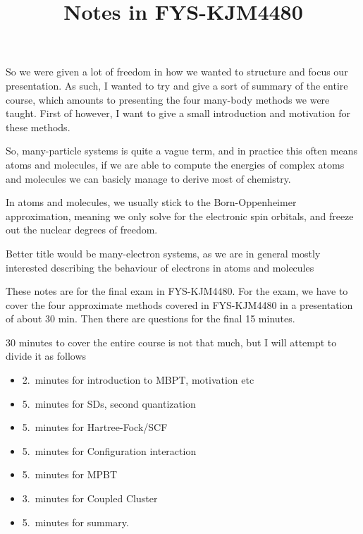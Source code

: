 \documentclass[a4paper, 11pt, notitlepage, english]{article}
\author{}
\title{Notes in FYS-KJM4480}
\begin{document}
So we were given a lot of freedom in how we wanted to structure and focus our presentation. As such, I wanted to try and give a sort of summary of the entire course, which amounts to presenting the four many-body methods we were taught. First of however, I want to give a small introduction and motivation for these methods.

So, many-particle systems is quite a vague term, and in practice this often means atoms and molecules, if we are able to compute the energies of complex atoms and molecules we can basicly  manage to derive most of chemistry. 

In atoms and molecules, we usually stick to the Born-Oppenheimer approximation, meaning we only solve for the electronic spin orbitals, and freeze out the nuclear degrees of freedom.




Better title would be many-electron systems, as we are in general mostly interested
describing the behaviour of electrons in atoms and molecules





\clearpage


These notes are for the final exam in FYS-KJM4480. For the exam, we have to cover the four approximate methods covered in FYS-KJM4480 in a presentation of about 30 min. Then there are questions for the final 15 minutes.

30 minutes to cover the entire course is not that much, but I will attempt to divide it as follows
\begin{itemize}
	\item 2.\ minutes for introduction to MBPT, motivation etc
	\item 5.\ minutes for SDs, second quantization
	\item 5.\ minutes for Hartree-Fock/SCF
	\item 5.\ minutes for Configuration interaction
	\item 5.\ minutes for MPBT
	\item 3.\ minutes for Coupled Cluster
	\item 5.\ minutes for summary.
\end{itemize}
\end{document}

